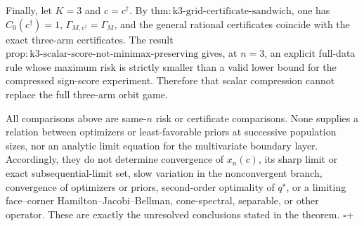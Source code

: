Finally, let \(K=3\) and \(c=c^\dagger\).  By \(\mathrm{thm:k3\text{-}grid\text{-}certificate\text{-}sandwich}\), one has \(C_0(c^\dagger)=1\), \(\Gamma_{M,c^\dagger}=\Gamma_M\), and the general rational certificates coincide with the exact three-arm certificates.  The result \(\mathrm{prop:k3\text{-}scalar\text{-}score\text{-}not\text{-}minimax\text{-}preserving}\) gives, at \(n=3\), an explicit full-data rule whose maximum risk is strictly smaller than a valid lower bound for the compressed sign-score experiment.  Therefore that scalar compression cannot replace the full three-arm orbit game.

All comparisons above are same-\(n\) risk or certificate comparisons.  None supplies a relation between optimizers or least-favorable priors at successive population sizes, nor an analytic limit equation for the multivariate boundary layer.  Accordingly, they do not determine convergence of \(x_n(c)\), its sharp limit or exact subsequential-limit set, slow variation in the nonconvergent branch, convergence of optimizers or priors, second-order optimality of \(q^\star\), or a limiting face--corner Hamilton--Jacobi--Bellman, cone-spectral, separable, or other operator.  These are exactly the unresolved conclusions stated in the theorem. \(\square\)+